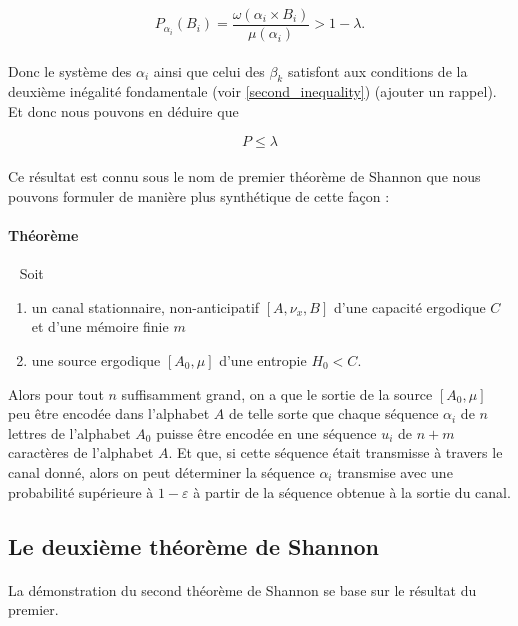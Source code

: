 	\[P_{\alpha_i}(B_i)=\frac{\omega(\alpha_i \times B_i)}{\mu(\alpha_i)}>1-\lambda.\]
	
	\paragraph{}
	Donc le système des $\alpha_i$ ainsi que celui des $\beta_k$ satisfont aux conditions de la deuxième inégalité fondamentale (voir \ref{second_inequality}) (ajouter un rappel). 
	Et donc nous pouvons en déduire que
	
	\[P\le \lambda\]
	
	\paragraph{}
	Ce résultat est connu sous le nom de premier théorème de Shannon que nous pouvons formuler de manière plus synthétique de cette façon :
	
	\paragraph{Théorème}\ 
	\newline
	Soit 
	\begin{enumerate}
		\item un canal stationnaire, non-anticipatif $[A,\nu_x,B]$ d'une capacité ergodique $C$ et d'une mémoire finie $m$
		\item une source ergodique $[A_0,\mu]$ d'une entropie $H_0<C$.
	\end{enumerate}
	Alors pour tout $n$ suffisamment grand, on a que le sortie de la source $[A_0,\mu]$ peu être encodée dans l'alphabet $A$ de telle sorte que
	chaque séquence $\alpha_i$ de $n$ lettres de l'alphabet $A_0$ puisse être encodée en une séquence $u_i$ de $n+m$ caractères de l'alphabet $A$. 
	Et que, si cette séquence était transmisse à travers le canal donné, alors on peut déterminer la séquence $\alpha_i$ transmise avec une probabilité 
	supérieure à $1-\varepsilon$ à partir de la séquence obtenue à la sortie du canal.
	
\subsection{Le deuxième théorème de Shannon}

	\paragraph{}La démonstration du second théorème de Shannon se base sur le résultat du premier. 
	
